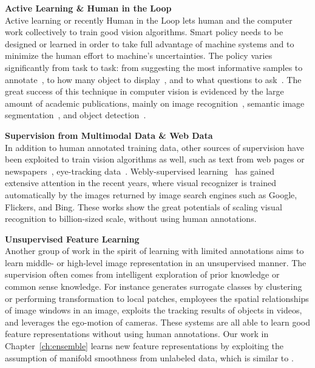 \textbf{Active Learning \& Human in the Loop}  \\
Active learning or recently Human in the Loop lets human and the computer work collectively to train good vision algorithms.  Smart policy needs to be designed or learned in order to take full advantage of machine systems and to minimize the human effort  to machine's uncertainties.  The policy varies significantly from task to task: from suggesting the most informative samples to annotate~\citep{AFrameSel, SIEAL}, to how many object to display~\citep{yao2012interactive}, and to what questions to ask~\citep{best:two:world, donot:bbox}. The great success of this technique in computer vision is evidenced by the large amount of academic publications, mainly on image recognition~\citep{joshi2009multi, visual:human:loop, ALdataset}, semantic image segmentation~\citep{expected:loss},  and object detection~\citep{best:two:world, donot:bbox}. 

\textbf{Supervision from Multimodal Data \& Web Data}   \\
In addition to human annotated training data, other sources of supervision have been exploited to train vision algorithms as well, such as text from web pages or newspapers~\citep{name:face:news, gupta2008beyond}, eye-tracking data~\citep{detect:eyetr}.
Webly-supervised learning~\citep{neil, web:cnn, everything:anything} has gained extensive attention in the recent years, where visual recognizer is trained automatically by the images returned by image search engines such as Google, Flickers, and Bing. These works show the great potentials of scaling visual recognition to billion-sized scale, without using human annotations. 



\textbf{Unsupervised Feature Learning}   \\
Another group of work in the spirit of learning with limited annotations aims to learn middle- or high-level image
representation in an unsupervised manner. The supervision often comes from intelligent exploration of prior knowledge or common sense knowledge.  For instance \citep{stl-10, cnnfet14}  generates surrogate classes by clustering or performing transformation to local patches, \citep{feature:context} employees the spatial relationships of 
image windows in an image, \citep{feature:video} exploits 
the tracking results of objects in videos, and \citep{learning:by:moving}  leverages the ego-motion of cameras.    
These systems are all able to learn good feature representations without using human annotations.  
Our work in Chapter~\ref{ch:ensemble} learns new feature representations by exploiting the assumption of manifold smoothness from unlabeled data, which is similar to \citep{stl-10, cnnfet14}. 
 


